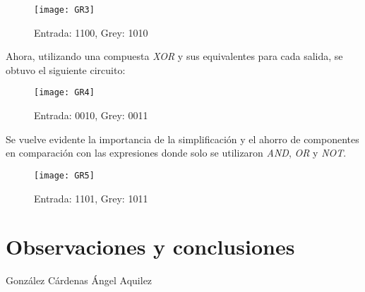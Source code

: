 \documentclass[a4paper,12pt]{article}
\begin{document}
\begin{figure}[ht!]
	\centering

	\texttt{[image: GR3]}

	\caption{Entrada: 1100, Grey: 1010}
\end{figure}

\newpage

Ahora, utilizando una compuesta \emph{XOR} y sus equivalentes para cada salida, se obtuvo el siguiente circuito:\par

\begin{figure}[ht!]
	\centering

	\texttt{[image: GR4]}

	\caption{Entrada: 0010, Grey: 0011}
\end{figure}

Se vuelve evidente la importancia de la simplificación y el ahorro de componentes en comparación con las expresiones donde solo se utilizaron \emph{AND}, \emph{OR} y \emph{NOT}.\par

\begin{figure}[ht!]
	\centering

	\texttt{[image: GR5]}

	\caption{Entrada: 1101, Grey: 1011}
\end{figure}



\newpage
%
%
%
%

\section{Observaciones y conclusiones}

González Cárdenas Ángel Aquilez
\end{document}
